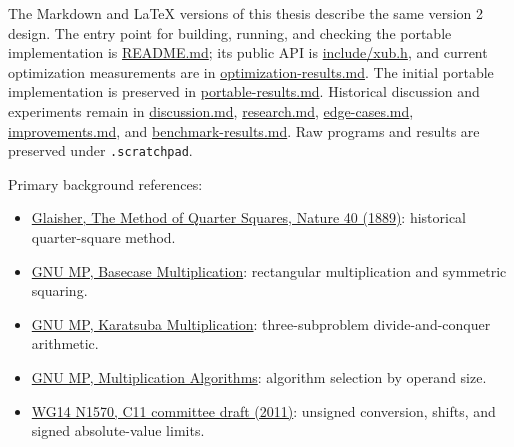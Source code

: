 \documentclass[11pt,a4paper]{article}
\begin{document}
The Markdown and LaTeX versions of this thesis describe the same version 2 design. The entry point for building, running, and checking the portable implementation is \href{\detokenize{README.md}}{README.md}; its public API is \href{\detokenize{include/xub.h}}{include/xub.h}, and current optimization measurements are in \href{\detokenize{optimization-results.md}}{optimization-results.md}. The initial portable implementation is preserved in \href{\detokenize{portable-results.md}}{portable-results.md}. Historical discussion and experiments remain in \href{\detokenize{discussion.md}}{discussion.md}, \href{\detokenize{research.md}}{research.md}, \href{\detokenize{edge-cases.md}}{edge-cases.md}, \href{\detokenize{improvements.md}}{improvements.md}, and \href{\detokenize{benchmark-results.md}}{benchmark-results.md}. Raw programs and results are preserved under \texttt{.scratchpad}.

Primary background references:

\begin{itemize}
\item \href{\detokenize{https://www.nature.com/articles/040573c0}}{Glaisher, The Method of Quarter Squares, Nature 40 (1889)}: historical quarter-square method.
\item \href{\detokenize{https://gmplib.org/manual/Basecase-Multiplication}}{GNU MP, Basecase Multiplication}: rectangular multiplication and symmetric squaring.
\item \href{\detokenize{https://gmplib.org/manual/Karatsuba-Multiplication}}{GNU MP, Karatsuba Multiplication}: three-subproblem divide-and-conquer arithmetic.
\item \href{\detokenize{https://gmplib.org/manual/Multiplication-Algorithms}}{GNU MP, Multiplication Algorithms}: algorithm selection by operand size.
\item \href{\detokenize{https://www.open-std.org/jtc1/sc22/wg14/www/docs/n1570.pdf}}{WG14 N1570, C11 committee draft (2011)}: unsigned conversion, shifts, and signed absolute-value limits.
\end{itemize}
\end{document}
